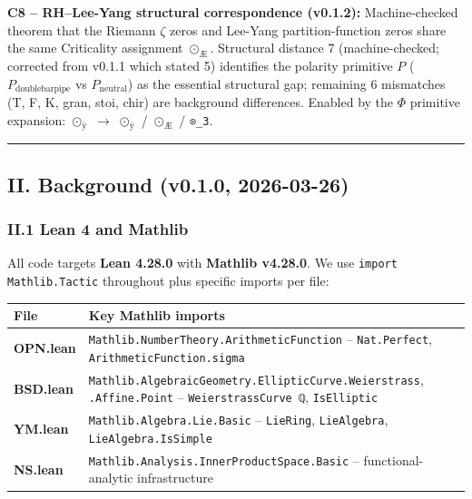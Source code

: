 \documentclass[12pt,a4paper]{article}
\begin{document}
\textbf{C8  --  RH--Lee-Yang structural correspondence (v0.1.2):} Machine-checked theorem that the Riemann $\zeta$ zeros and Lee-Yang partition-function zeros share the same Criticality assignment $\odot_{\text{Æ}}$. Structural distance 7 (machine-checked; corrected from v0.1.1 which stated 5) identifies the polarity primitive $P$ ($P_{\text{doublebarpipe}}$ vs $P_\text{neutral}$) as the essential structural gap; remaining 6 mismatches (T, F, K, gran, stoi, chir) are background differences. Enabled by the $\Phi$ primitive expansion: $\odot_{\text{ÿ}}$ $\rightarrow$ $\odot_{\text{ÿ}}$ / $\odot_{\text{Æ}}$ / \texttt{⊙\_3}.

\begin{center}
\rule{0.5\textwidth}{0.4pt}
\end{center}

\subsection{II. Background (v0.1.0, 2026-03-26)}

\subsubsection{II.1 Lean 4 and Mathlib}

All code targets \textbf{Lean 4.28.0} with \textbf{Mathlib v4.28.0}. We use \texttt{import Mathlib.Tactic} throughout plus specific imports per file:

\begin{table}[htbp]
\centering
\small
{}
\begin{tabularx}{\textwidth}{>{\centering\arraybackslash}X >{\centering\arraybackslash}X}
\toprule
\rowcolor{gray!25}\textbf{File} & \textbf{Key Mathlib imports} \\
\midrule
\rowcolors{1}{white}{gray!10}
\textbf{OPN.lean} & \texttt{Mathlib.NumberTheory.ArithmeticFunction}  --  \texttt{Nat.Perfect}, \texttt{ArithmeticFunction.sigma} \\
\textbf{BSD.lean} & \texttt{Mathlib.AlgebraicGeometry.EllipticCurve.Weierstrass}, \texttt{.Affine.Point}  --  \texttt{WeierstrassCurve ℚ}, \texttt{IsElliptic} \\
\textbf{YM.lean} & \texttt{Mathlib.Algebra.Lie.Basic}  --  \texttt{LieRing}, \texttt{LieAlgebra}, \texttt{LieAlgebra.IsSimple} \\
\textbf{NS.lean} & \texttt{Mathlib.Analysis.InnerProductSpace.Basic}  --  functional-analytic infrastructure \\
\bottomrule
\end{tabularx}
\end{table}
\end{document}
